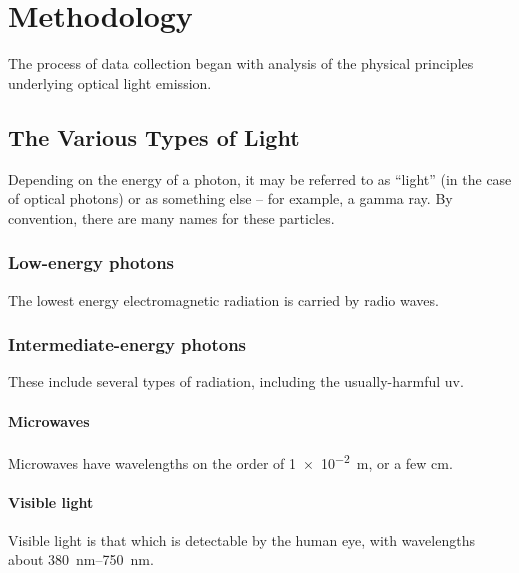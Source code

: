 
\chapter{Methodology}
\thispagestyle{myheadings}

The process of data collection began with analysis of the physical principles underlying optical light emission.

\section{The Various Types of Light}

Depending on the energy of a photon, it may be referred to as ``light'' (in the case of optical photons) or as something else -- for example, a gamma ray. By convention, there are many names for these particles.

\subsection{Low-energy photons}

The lowest energy electromagnetic radiation is carried by radio waves.

\subsection{Intermediate-energy photons}

These include several types of radiation, including the usually-harmful \gls{uv}.

\subsubsection{Microwaves}

Microwaves have wavelengths on the order of \SI{1e-2}{\meter}, or a few \si{\centi\meter}.

\subsubsection{Visible light}

Visible light is that which is detectable by the human eye, with wavelengths about \SIrange{380}{750}{\nano\meter}.

